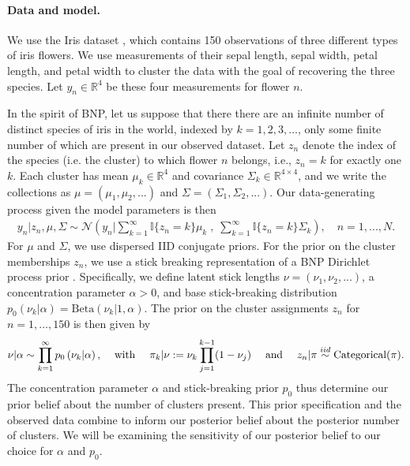 \paragraph{Data and model.}
We use the Iris dataset \citep{iris_data_anderson, iris_data_fisher}, which
contains 150 observations of three different types of iris flowers. We use
measurements of their sepal length, sepal width, petal length, and petal width
to cluster the data with the goal of recovering the three species. Let $y_{n}\in
\mathbb{R}^4$ be these four measurements for flower $n$.

In the spirit of BNP, let us suppose that there there are an infinite number of
distinct species of iris in the world, indexed by $k=1,2,3,\ldots$, only some
finite number of which are present in our observed dataset.  Let $z_n$ denote
the index of the species (i.e. the cluster) to which flower $n$ belongs, i.e.,
$z_n = k$ for exactly one $k$. Each cluster has mean $\mu_k\in
\mathbb{R}^4$ and covariance $\Sigma_k \in \mathbb{R}^{4\times 4}$, and we write
the collections as $\mu = \left(\mu_1, \mu_2, ...\right)$ and $\Sigma =
\left(\Sigma_1, \Sigma_2, ... \right)$. Our data-generating process given the
model parameters is then
%
\begin{align*}
	y_n | z_n, \mu, \Sigma \sim
        \mathcal{N}\left(
            y_n \Big\vert
                \sum_{k=1}^\infty \mathbb{I}\{z_n = k\} \mu_k \;,
              \; \sum_{k=1}^\infty \mathbb{I}\{z_n = k\} \Sigma_k\right),
	\quad n = 1, ..., N.
\end{align*}
%
For $\mu$ and $\Sigma$, we use dispersed IID conjugate priors. For the prior on
the cluster memberships $z_n$, we use a stick breaking representation of a BNP
Dirichlet process prior \citep{mccloskey:1965:model, ferguson:1973:bayesian,
patil:1977:diversity, sethuraman:1994:constructivedp}. Specifically, we define
latent stick lengths $\nu=\left(\nu_1, \nu_2, ...\right)$, a concentration
parameter $\alpha>0$, and base stick-breaking distribution $p_{0}\left(\nu_k
\vert \alpha \right) = \mathrm{Beta}\left(\nu_k \Big\vert 1, \alpha \right)$.
The prior on the cluster assignments $z_n$ for $n=1,...,150$ is then given by
%
\begin{align}
\nu \vert \alpha \sim \prod_{k=1}^\infty p_{0}\left(\nu_k \vert \alpha \right)
\textrm{,}
    \quad\textrm{ with }\quad
\pi_k | \nu := \nu_k \prod_{j=1}^{k-1} (1 - \nu_j)
\quad\textrm{ and }\quad
z_n \vert \pi \stackrel{iid}{\sim} \mathrm{Categorical}(\pi). \label{eq:stick_breaking}
\end{align}
%
The concentration parameter $\alpha$ and stick-breaking prior $p_{0}$
thus determine our prior belief about the number of clusters present. This prior
specification and the observed data combine to inform our posterior belief about the
posterior number of clusters. We will be examining the sensitivity of our
posterior belief to our choice for $\alpha$ and $p_{0}$.
